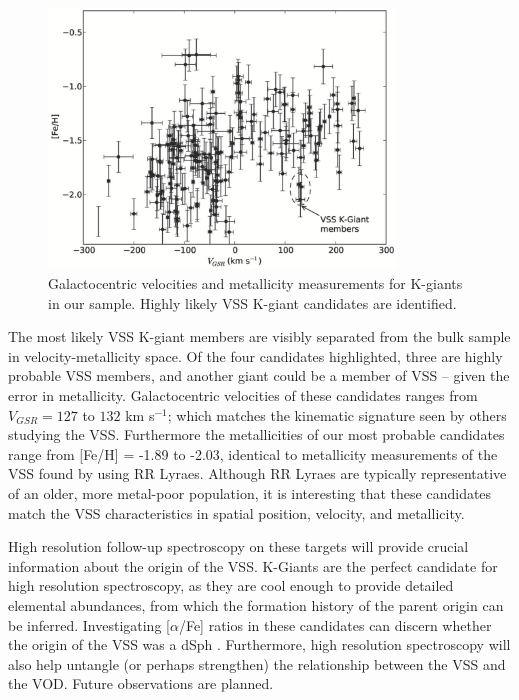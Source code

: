 \documentclass{emulateapj}
\begin{document}
	\begin{figure}
		\centering
		\includegraphics[width=9.2cm]{./figures/vss-candidates_copy.eps}
		\caption{Galactocentric velocities and metallicity measurements for K-giants in our sample. Highly likely VSS K-giant candidates are identified.}
		\label{fig:velocity-metallicity}
	\end{figure}
	
	The most likely VSS K-giant members are visibly separated from the bulk sample in velocity-metallicity space. Of the four candidates highlighted, three are highly probable VSS members, and another giant could be a member of VSS \--- given the error in metallicity. Galactocentric velocities of these candidates ranges from $V_{GSR} = 127$ to $132$ km s$^{-1}$; which matches the kinematic signature seen by others studying the VSS. Furthermore the metallicities of our most probable candidates range from [Fe/H] = -1.89 to -2.03, identical to metallicity measurements of the VSS found by \citet{Prior;et-al_2009a} using RR Lyraes. Although RR Lyraes are typically representative of an older, more metal-poor population, it is interesting that these candidates match the VSS characteristics in spatial position, velocity, and metallicity.

	High resolution follow-up spectroscopy on these targets will provide crucial information about the origin of the VSS. K-Giants are the perfect candidate for high resolution spectroscopy, as they are cool enough to provide detailed elemental abundances, from which the formation history of the parent origin can be inferred. Investigating [$\alpha$/Fe] ratios in these candidates can discern whether the origin of the VSS was a dSph \citep{Venn;et-al_2004, Casetti-Dinescu;et-al_2009}. Furthermore, high resolution spectroscopy will also help untangle (or perhaps strengthen) the relationship between the VSS and the VOD. Future observations are planned.
\end{document}

